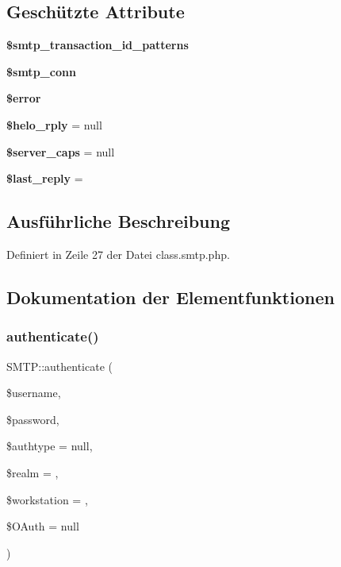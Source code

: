 \subsection*{Geschützte Attribute}
\begin{DoxyCompactItemize}
\item 
{\bfseries \$smtp\+\_\+transaction\+\_\+id\+\_\+patterns}
\item 
\mbox{\label{class_s_m_t_p_a489b5e4392d1fe7cc9e380c9f59fb40e}} 
{\bfseries \$smtp\+\_\+conn}
\item 
{\bfseries \$error}
\item 
\mbox{\label{class_s_m_t_p_a13804c297a331da2de5543fd1da0443e}} 
{\bfseries \$helo\+\_\+rply} = null
\item 
\mbox{\label{class_s_m_t_p_a1edb50d3625d2c45672f463cdea12cf2}} 
{\bfseries \$server\+\_\+caps} = null
\item 
\mbox{\label{class_s_m_t_p_a73c7c5a610d1b947b010e2ee669ec044}} 
{\bfseries \$last\+\_\+reply} = \textquotesingle{}\textquotesingle{}
\end{DoxyCompactItemize}


\subsection{Ausführliche Beschreibung}


Definiert in Zeile 27 der Datei class.\+smtp.\+php.



\subsection{Dokumentation der Elementfunktionen}
\mbox{\label{class_s_m_t_p_ad440c7b08d3cefc810df92cb187fe665}} 
\subsubsection{\texorpdfstring{authenticate()}{authenticate()}}
{\footnotesize\ttfamily S\+M\+T\+P\+::authenticate (\begin{DoxyParamCaption}\item[{}]{\$username,  }\item[{}]{\$password,  }\item[{}]{\$authtype = {\ttfamily null},  }\item[{}]{\$realm = {\ttfamily \textquotesingle{}\textquotesingle{}},  }\item[{}]{\$workstation = {\ttfamily \textquotesingle{}\textquotesingle{}},  }\item[{}]{\$\+O\+Auth = {\ttfamily null} }\end{DoxyParamCaption})}

